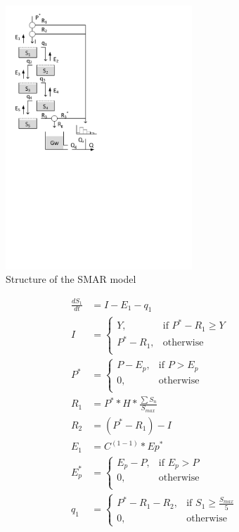 { 																	%
\begin{figure}
\includegraphics[trim=1cm 13cm 7cm 1cm,width=7cm,keepaspectratio]{./AppA_files/40_schematic.pdf}
\caption{Structure of the SMAR model} \label{fig:40_schematic}
\end{figure}

\begin{align}
	\frac{dS_1}{dt} &= I-E_1-q_1 \\
	I &= \begin{cases}
		Y, &\text{if } P^*-R_1 \geq Y \\
		P^*-R_1, & \text{otherwise} \\
		\end{cases}\\
	P^* &= \begin{cases}
		P-E_p, &\text{if } P > E_p \\
		0, & \text{otherwise} \\
	\end{cases} \\
	R_1 &= P^**H*\frac{\sum{S_n}}{S_{max}}\\
	R_2 &= \left(P^*-R_1\right) - I\\
	E_1 &= C^{(1-1)}*Ep^* \\
	E_p^* &= \begin{cases}
		E_p-P, &\text{if } E_p > P \\
		0, & \text{otherwise} \\
	\end{cases} \\
	q_1 &= 
	\begin{cases}
		P^*-R_1-R_2, & \text{if } S_1 \geq \frac{S_{max}}{5} \\
		0, & \text{otherwise}
	\end{cases}
\end{align}

} %

